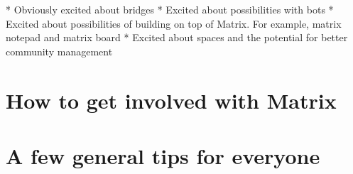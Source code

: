 \documentclass{acm}
\begin{document}
\begin{frame}
  * Obviously excited about bridges
  * Excited about possibilities with bots
  * Excited about possibilities of building on top of Matrix. For example,
    matrix notepad and matrix board
  * Excited about spaces and the potential for better community management
\end{frame}

\section{How to get involved with Matrix}

\section{A few general tips for everyone}
\end{document}
